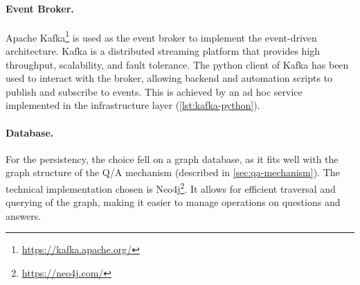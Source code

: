 \documentclass[12pt,a4paper,openright,twoside]{book}
\begin{document}



\paragraph{Event Broker.}

Apache Kafka\footnote{\href{https://kafka.apache.org/}{https://kafka.apache.org/}} is used as the event broker to implement the event-driven architecture.
%
Kafka is a distributed streaming platform that provides high throughput, scalability, and fault tolerance.
%
The python client of Kafka has been used to interact with the broker, allowing backend and automation scripts to publish and subscribe to events.
%
This is achieved by an ad hoc service implemented in the infrastructure layer (\cref{lst:kafka-python}).





\paragraph{Database.}

For the persistency, the choice fell on a graph database, as it fits well with the graph structure of the \ac{Q/A} mechanism (described in \cref{sec:qa-mechanism}). The technical implementation chosen is Neo4j\footnote{\href{https://neo4j.com/}{https://neo4j.com/}}.
%
It allows for efficient traversal and querying of the graph, making it easier to manage operations on questions and answers.
\end{document}
